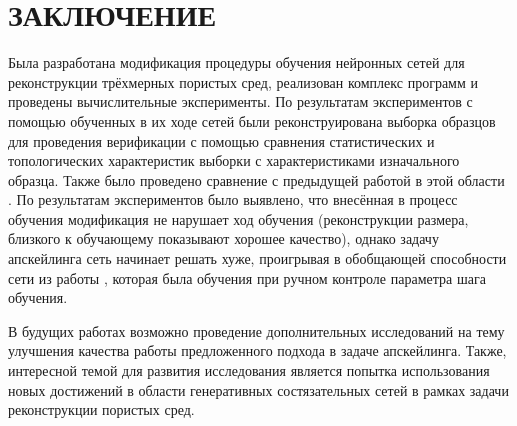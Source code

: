 \clearpage
\section*{\hfil ЗАКЛЮЧЕНИЕ \hfil}
	Была разработана модификация процедуры обучения нейронных сетей для реконструкции трёхмерных пористых сред, реализован комплекс программ и проведены вычислительные эксперименты. По результатам экспериментов с помощью обученных в их ходе сетей были реконструирована выборка образцов для проведения верификации с помощью сравнения статистических и топологических характеристик выборки с характеристиками изначального образца. Также было проведено сравнение с предыдущей работой в этой области \cite{Mosser}. По результатам экспериментов было выявлено, что внесённая в процесс обучения модификация не нарушает ход обучения (реконструкции размера, близкого к обучающему показывают хорошее качество), однако задачу апскейлинга сеть начинает решать хуже, проигрывая в обобщающей способности сети из работы \cite{Mosser}, которая была обучения при ручном контроле параметра шага обучения.
	
	В будущих работах возможно проведение дополнительных исследований на тему улучшения качества работы предложенного подхода в задаче апскейлинга. Также, интересной темой для развития исследования является попытка использования новых достижений в области генеративных состязательных сетей в рамках задачи реконструкции пористых сред.